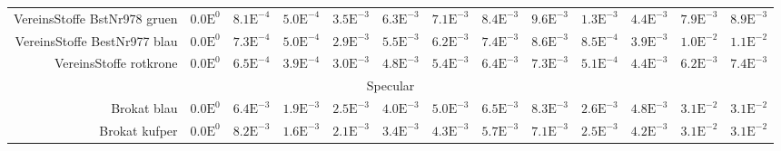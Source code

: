 \begin{landscape}
\begin{table}
\begin{tabularx}{\linewidth}{r | rr | rrrrrr | rrrr}
        VereinsStoffe BstNr978 gruen & \footnotesize{$0.0\mathrm{E}^{0}$}& \footnotesize{$8.1\mathrm{E}^{-4}$}& \footnotesize{$5.0\mathrm{E}^{-4}$}& \footnotesize{$3.5\mathrm{E}^{-3}$}& \footnotesize{$6.3\mathrm{E}^{-3}$}& \footnotesize{$7.1\mathrm{E}^{-3}$}& \footnotesize{$8.4\mathrm{E}^{-3}$}& \footnotesize{$9.6\mathrm{E}^{-3}$}& \footnotesize{$1.3\mathrm{E}^{-3}$}& \footnotesize{$4.4\mathrm{E}^{-3}$}& \footnotesize{$7.9\mathrm{E}^{-3}$}& \footnotesize{$8.9\mathrm{E}^{-3}$}\\
        VereinsStoffe BestNr977 blau & \footnotesize{$0.0\mathrm{E}^{0}$}& \footnotesize{$7.3\mathrm{E}^{-4}$}& \footnotesize{$5.0\mathrm{E}^{-4}$}& \footnotesize{$2.9\mathrm{E}^{-3}$}& \footnotesize{$5.5\mathrm{E}^{-3}$}& \footnotesize{$6.2\mathrm{E}^{-3}$}& \footnotesize{$7.4\mathrm{E}^{-3}$}& \footnotesize{$8.6\mathrm{E}^{-3}$}& \footnotesize{$8.5\mathrm{E}^{-4}$}& \footnotesize{$3.9\mathrm{E}^{-3}$}& \footnotesize{$1.0\mathrm{E}^{-2}$}& \footnotesize{$1.1\mathrm{E}^{-2}$}\\
        VereinsStoffe rotkrone  & \footnotesize{$0.0\mathrm{E}^{0}$}& \footnotesize{$6.5\mathrm{E}^{-4}$}& \footnotesize{$3.9\mathrm{E}^{-4}$}& \footnotesize{$3.0\mathrm{E}^{-3}$}& \footnotesize{$4.8\mathrm{E}^{-3}$}& \footnotesize{$5.4\mathrm{E}^{-3}$}& \footnotesize{$6.4\mathrm{E}^{-3}$}& \footnotesize{$7.3\mathrm{E}^{-3}$}& \footnotesize{$5.1\mathrm{E}^{-4}$}& \footnotesize{$4.4\mathrm{E}^{-3}$}& \footnotesize{$6.2\mathrm{E}^{-3}$}& \footnotesize{$7.4\mathrm{E}^{-3}$}\\
        \midrule
        \multicolumn{13}{c}{Specular}\\
        \midrule
        Brokat blau & \footnotesize{$0.0\mathrm{E}^{0}$}& \footnotesize{$6.4\mathrm{E}^{-3}$}& \footnotesize{$1.9\mathrm{E}^{-3}$}& \footnotesize{$2.5\mathrm{E}^{-3}$}& \footnotesize{$4.0\mathrm{E}^{-3}$}& \footnotesize{$5.0\mathrm{E}^{-3}$}& \footnotesize{$6.5\mathrm{E}^{-3}$}& \footnotesize{$8.3\mathrm{E}^{-3}$}& \footnotesize{$2.6\mathrm{E}^{-3}$}& \footnotesize{$4.8\mathrm{E}^{-3}$}& \footnotesize{$3.1\mathrm{E}^{-2}$}& \footnotesize{$3.1\mathrm{E}^{-2}$}\\
        Brokat kufper & \footnotesize{$0.0\mathrm{E}^{0}$}& \footnotesize{$8.2\mathrm{E}^{-3}$}& \footnotesize{$1.6\mathrm{E}^{-3}$}& \footnotesize{$2.1\mathrm{E}^{-3}$}& \footnotesize{$3.4\mathrm{E}^{-3}$}& \footnotesize{$4.3\mathrm{E}^{-3}$}& \footnotesize{$5.7\mathrm{E}^{-3}$}& \footnotesize{$7.1\mathrm{E}^{-3}$}& \footnotesize{$2.5\mathrm{E}^{-3}$}& \footnotesize{$4.2\mathrm{E}^{-3}$}& \footnotesize{$3.1\mathrm{E}^{-2}$}& \footnotesize{$3.1\mathrm{E}^{-2}$}\\

\end{tabularx}
\end{table}
\end{landscape}
